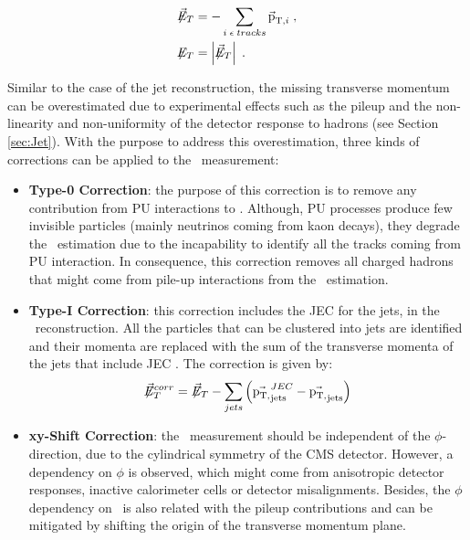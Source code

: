 \begin{equation} \label{eq:MET}
\begin{aligned}
\not\!\!\vec{E}_T &= -  \sum_{i \; \epsilon \; tracks} \vec{\textrm{p}}_{\textrm{T}, i} \; , \\
\not\!\!E_T &= \left| \not\!\!\vec{E}_T \right| \;.
\end{aligned}
\end{equation}

\noindent Similar to the case of the jet reconstruction, the missing transverse momentum
can be overestimated due to experimental effects such 
as the pileup and the non-linearity and non-uniformity of the detector response to 
hadrons (see Section \ref{sec:Jet}). With the purpose to address this overestimation, 
three kinds of corrections can be applied to the \METv~measurement:

\begin{itemize}
 \item \textbf{Type-0 Correction}: the purpose of this correction is to remove any contribution 
 from PU interactions to \METv. Although, PU processes produce few invisible particles (mainly
 neutrinos coming from kaon decays), they degrade the \METv~estimation due to the incapability
 to identify all the tracks coming from PU interaction. In consequence, this correction 
 removes all charged hadrons that might come from pile-up interactions from the \METv~estimation.
  \item \textbf{Type-I Correction}: this correction includes the JEC for the jets, in the 
  \METv~reconstruction. All the particles that can be clustered into jets are identified 
  and their momenta are replaced with the sum of the transverse momenta of the 
  jets that include JEC \cite{METPerformance2}. The correction is given by:
  \begin{equation}
  \label{eq:METcorrection}
  \not\!\!\vec{E}_T^{corr} =~\not\!\!\vec{E}_T - \sum_{jets} \left( \vec{\textrm{p}_{\textrm{T,}}}_{\textrm{jets}}^{JEC} - \vec{\textrm{p}_{\textrm{T,}}}_{\textrm{jets}} \right)
\end{equation} 
 
 \item \textbf{xy-Shift Correction}: the \MET~measurement should be independent of the $\phi$-direction,
 due to the cylindrical symmetry of the CMS detector. However, a dependency on $\phi$ is observed, which 
 might come from anisotropic detector responses, inactive calorimeter cells or detector 
 misalignments. Besides, the $\phi$ dependency on \MET~is also related with the pileup
 contributions and can be mitigated by shifting the origin of the transverse momentum plane.
\end{itemize}


